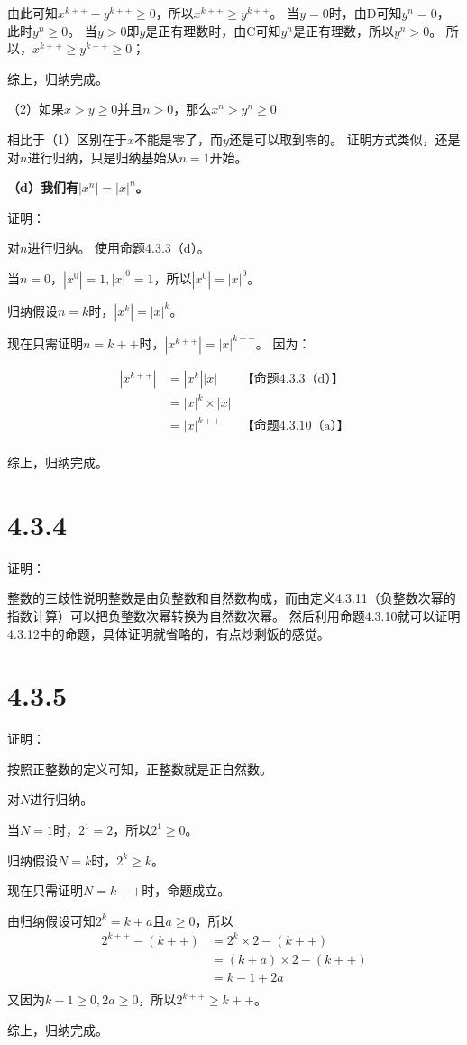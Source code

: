 \documentclass{article}
\theoremstyle{mystyle}
\begin{document}
由此可知$x^{k++} - y^{k++} \geq 0$，所以$x^{k++} \geq y^{k++}$。
当$y=0$时，由D可知$y^n = 0$，此时$y^n \geq 0$。
当$y>0$即$y$是正有理数时，由C可知$y^n$是正有理数，所以$y^n > 0$。
所以，$x^{k++} \geq y^{k++} \geq 0$；

综上，归纳完成。

（2）如果$x > y \geq 0$并且$n > 0$，那么$x^n > y^n \geq 0$

相比于（1）区别在于$x$不能是零了，而$y$还是可以取到零的。
证明方式类似，还是对$n$进行归纳，只是归纳基始从$n=1$开始。

\textbf{（d）我们有$|x^n|=|x|^n$。}

证明：

对$n$进行归纳。 使用命题4.3.3（d）。

当$n=0$，$|x^0| = 1, |x|^0 =1$，所以$|x^0| = |x|^0$。

归纳假设$n=k$时，$|x^k| = |x|^k$。

现在只需证明$n=k++$时，$|x^{k++}|=|x|^{k++}$。
因为：

\begin{align*}
  |x^{k++}| & = |x^k||x|         & \text{【命题4.3.3（d）】}  \\
            & = |x|^k \times |x|                        \\
            & = |x|^{k++}        & \text{【命题4.3.10（a）】} \\
\end{align*}

综上，归纳完成。

\section*{4.3.4}

证明：

整数的三歧性说明整数是由负整数和自然数构成，而由定义4.3.11（负整数次幂的指数计算）可以把负整数次幂转换为自然数次幂。
然后利用命题4.3.10就可以证明4.3.12中的命题，具体证明就省略的，有点炒剩饭的感觉。


\section*{4.3.5}

证明：

按照正整数的定义可知，正整数就是正自然数。

对$N$进行归纳。

当$N=1$时，$2^1 = 2$，所以$2^1 \geq 0$。

归纳假设$N=k$时，$2^k \geq k$。

现在只需证明$N=k++$时，命题成立。

由归纳假设可知$2^k = k + a$且$a \geq 0$，所以
\begin{align*}
  2^{k++} - (k++) & = 2^k \times 2 - (k++)   \\
                  & = (k+a) \times 2 - (k++) \\
                  & = k-1 + 2a               \\
\end{align*}
又因为$k-1 \geq 0, 2a \geq 0$，所以$2^{k++} \geq k++$。

综上，归纳完成。
\end{document}
